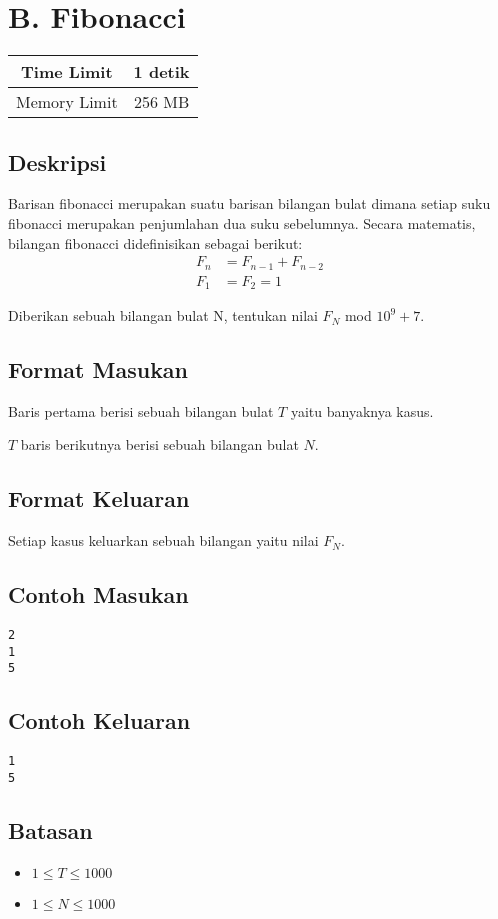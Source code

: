 \documentclass{article}
\begin{document}
\section*{\hfil B. Fibonacci\hfil}

\begin{center}
\begin{tabular}{ |cc| } 
 \hline
 Time Limit & 1 detik \\ 
 \hline
 Memory Limit & 256 MB \\
 \hline
\end{tabular}
\end{center}

\subsection*{Deskripsi}

\par\noindent Barisan fibonacci merupakan suatu barisan bilangan bulat dimana setiap suku fibonacci merupakan penjumlahan dua suku sebelumnya. Secara matematis, bilangan fibonacci didefinisikan sebagai berikut:
\begin{align*}
F_n & = F_{n-1} + F_{n-2} \\
F_1 & = F_2 = 1
\end{align*}
\par\noindent Diberikan sebuah bilangan bulat N, tentukan nilai $F_N$ mod $10^9+7$.

\subsection*{Format Masukan}

\par\noindent Baris pertama berisi sebuah bilangan bulat $T$ yaitu banyaknya kasus.
\par\noindent $T$ baris berikutnya berisi sebuah bilangan bulat $N$.

\subsection*{Format Keluaran}

\par\noindent Setiap kasus keluarkan sebuah bilangan yaitu nilai $F_N$.

\subsection*{Contoh Masukan}

\begin{lstlisting}
2
1
5
\end{lstlisting}

\subsection*{Contoh Keluaran}

\begin{lstlisting}
1
5
\end{lstlisting}


\subsection*{Batasan}

\begin{itemize}
	\item $1 \leq T \leq 1000$
	\item $1 \leq N \leq 1000$
\end{itemize}
\end{document}
